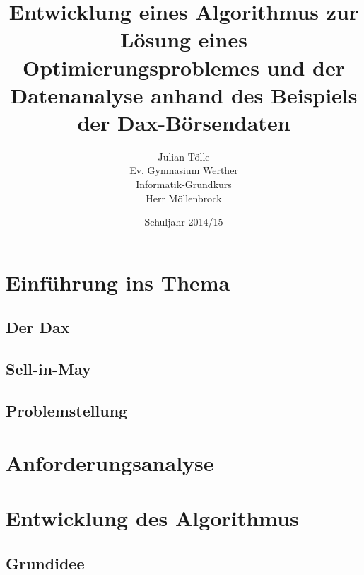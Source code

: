 \documentclass[12pt, a4paper, titlepage]{report}
\begin{document}
    \begin{titlepage}
        \title{Entwicklung eines Algorithmus zur Lösung eines Optimierungsproblemes und der Datenanalyse anhand des Beispiels der Dax-Börsendaten}
        \author{Julian Tölle\\
                Ev. Gymnasium Werther\\
                Informatik-Grundkurs\\
                Herr Möllenbrock}
        \date{Schuljahr 2014/15}

        \maketitle
    \end{titlepage}

    \tableofcontents
    \thispagestyle{empty}

    \setcounter{page}{2}

    \chapter{Einführung ins Thema}
        
        \section{Der Dax}

        \section{Sell-in-May}

        \section{Problemstellung}

    \chapter{Anforderungsanalyse}

    \chapter{Entwicklung des Algorithmus}

        \section{Grundidee}
\end{document}
